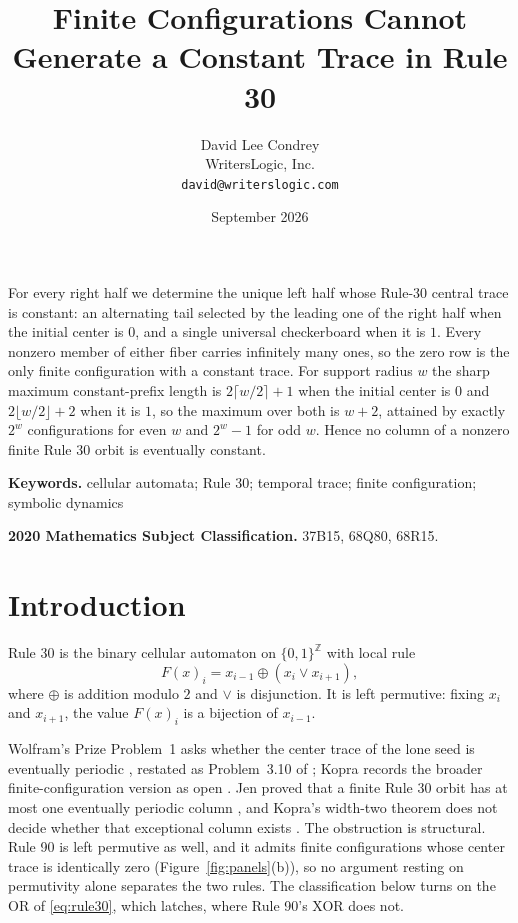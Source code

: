 \documentclass[11pt]{article}
\title{\vspace{-2.2em}Finite Configurations Cannot Generate a Constant Trace in Rule 30}
\author{David Lee Condrey\\WritersLogic, Inc.\\\texttt{david@writerslogic.com}}
\date{September 2026\vspace{-1.5em}}
\renewenvironment{abstract}{\small\quotation}{\endquotation}
\begin{document}
\maketitle

\begin{abstract}
For every right half we determine the unique left half whose Rule-30 central
trace is constant: an alternating tail selected by the leading one of the right
half when the initial center is $0$, and a single universal checkerboard when it
is $1$.  Every nonzero member of either fiber carries infinitely many ones, so
the zero row is the only finite configuration with a constant trace.  For
support radius $w$ the sharp maximum constant-prefix length is
$2\lceil w/2\rceil+1$ when the initial center is $0$ and $2\lfloor w/2\rfloor+2$
when it is $1$, so the maximum over both is $w+2$, attained by exactly $2^w$
configurations for even $w$ and $2^w-1$ for odd $w$.  Hence no column of a
nonzero finite Rule 30 orbit is eventually constant.
\end{abstract}

\noindent\textbf{Keywords.} cellular automata; Rule 30; temporal trace;
finite configuration; symbolic dynamics

\noindent\textbf{2020 Mathematics Subject Classification.} 37B15, 68Q80,
68R15.

\section{Introduction}

Rule 30 is the binary cellular automaton on $\{0,1\}^{\mathbb Z}$ with local rule
\begin{equation}\label{eq:rule30}
 F(x)_i=x_{i-1}\mathbin{\oplus}(x_i\mathbin{\lor}x_{i+1}),
\end{equation}
where $\oplus$ is addition modulo $2$ and $\lor$ is disjunction.  It is left
permutive: fixing $x_i$ and $x_{i+1}$, the value $F(x)_i$ is a bijection of
$x_{i-1}$.

Wolfram's Prize Problem~1 asks whether the center trace of the lone seed is
eventually periodic \cite{wolfram}, restated as Problem~3.10 of \cite{kopra};
Kopra records the broader
finite-configuration version as open \cite{kopra-thesis}.  Jen proved that a
finite Rule 30 orbit has at most one eventually periodic column
\cite[Thm.~2b]{jen1986}\cite[Prop.~3]{jen}, and Kopra's width-two theorem does
not decide whether that exceptional column exists \cite{kopra}.  The obstruction
is structural.  Rule 90 is left permutive as well, and it admits finite
configurations whose center trace is identically zero
(Figure~\ref{fig:panels}(b)), so no argument resting on permutivity alone
separates the two rules.  The classification below turns on the OR of
\eqref{eq:rule30}, which latches, where Rule 90's XOR does not.
\end{document}

